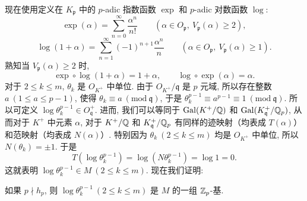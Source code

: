现在使用定义在 $K_{\mathfrak{p}}$ 中的 $p$-adic 指数函数 $\exp$ 和 $p$-adic 对数函数 $\log$:
\[
  \exp(\alpha)=\sum_{n=0}^{\infty}\frac{\alpha^n}{n!}
  \qquad(\alpha\in O_{\mathfrak{p}},\ V_{\mathfrak{p}}(\alpha)\geqslant 2),
\]
\[
  \log(1+\alpha)=\sum_{n=1}^{\infty}(-1)^{n+1}\frac{\alpha^n}{n}
  \qquad(\alpha\in O_{\mathfrak{p}},\ V_{\mathfrak{p}}(\alpha)\geqslant 1).
\]
熟知当 $V_{\mathfrak{p}}(\alpha)\geqslant 2$ 时,
\[
  \exp\circ\log(1+\alpha)=1+\alpha,\qquad\log\circ\exp(\alpha)=\alpha.
\]
对于 $2\leqslant k\leqslant m$, $\theta_k$ 是 $O_{K^+}$ 中单位. 由于 $O_{K^+}/\mathfrak{q}$ 是 $p$ 元域, 所以存在整数 $a\ (1\leqslant a\leqslant p-1)$, 使得 $\theta_k\equiv a\ (\mathrm{mod}\ \mathfrak{q})$, 于是 $\theta_k^{p-1}\equiv a^{p-1}\equiv 1\ (\mathrm{mod}\ \mathfrak{q})$. 所以可定义 $\log\theta_k^{p-1}\in O_{\mathfrak{q}}^+$. 进而, 我们可以等同于 $\operatorname{Gal}(K^+/\mathbb{Q})$ 和 $\operatorname{Gal}(K_{\mathfrak{q}}^+/\mathbb{Q}_p)$, 从而对于 $K^+$ 中元素 $\alpha$, 对于 $K^+/\mathbb{Q}$ 和 $K_{\mathfrak{q}}^+/\mathbb{Q}_p$ 有同样的迹映射（均表成 $T(\alpha)$）和范映射（均表成 $N(\alpha)$）. 特别因为 $\theta_k\ (2\leqslant k\leqslant m)$ 均是 $O_{K^+}$ 中单位, 所以 $N(\theta_k)=\pm 1$. 于是
\[
  T(\log\theta_k^{p-1})=\log(N\theta_k^{p-1})=\log 1=0.
\]
这就表明 $\log\theta_k^{p-1}\in M\ (2\leqslant k\leqslant m)$. 现在我们证明:

\begin{lemma}\label{lem:ch9-3}
如果 $p\nmid h_p$, 则 $\log\theta_k^{p-1}\ (2\leqslant k\leqslant m)$ 是 $M$ 的一组 $\mathbb{Z}_p$-基.
\end{lemma}


